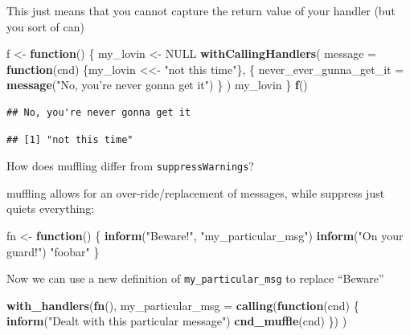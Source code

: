 \documentclass[]{book}
\newenvironment{Shaded}{\begin{snugshade}}{\end{snugshade}}
\newcommand{\ControlFlowTok}[1]{\textcolor[rgb]{0.13,0.29,0.53}{\textbf{#1}}}
\newcommand{\DataTypeTok}[1]{\textcolor[rgb]{0.13,0.29,0.53}{#1}}
\newcommand{\KeywordTok}[1]{\textcolor[rgb]{0.13,0.29,0.53}{\textbf{#1}}}
\newcommand{\NormalTok}[1]{#1}
\newcommand{\OtherTok}[1]{\textcolor[rgb]{0.56,0.35,0.01}{#1}}
\newcommand{\StringTok}[1]{\textcolor[rgb]{0.31,0.60,0.02}{#1}}
\begin{document}
This just means that you cannot capture the return value of your handler (but you sort of can)

\begin{Shaded}
\begin{Highlighting}[]
\NormalTok{f <-}\StringTok{ }\ControlFlowTok{function}\NormalTok{() \{}
\NormalTok{  my_lovin <-}\StringTok{ }\OtherTok{NULL}
  \KeywordTok{withCallingHandlers}\NormalTok{(}
    \DataTypeTok{message =} \ControlFlowTok{function}\NormalTok{(cnd) \{my_lovin <<-}\StringTok{ "not this time"}\NormalTok{\},}
\NormalTok{    \{}
\NormalTok{      never_ever_gunna_get_it =}\StringTok{ }\KeywordTok{message}\NormalTok{(}\StringTok{"No, you're never gonna get it"}\NormalTok{)}
\NormalTok{    \}}
\NormalTok{  )}
\NormalTok{  my_lovin}
\NormalTok{\}}
\KeywordTok{f}\NormalTok{()}
\end{Highlighting}
\end{Shaded}

\begin{verbatim}
## No, you're never gonna get it
\end{verbatim}

\begin{verbatim}
## [1] "not this time"
\end{verbatim}

How does muffling differ from \texttt{suppressWarnings}?

muffling allows for an over-ride/replacement of messages, while suppress just quiets everything:

\begin{Shaded}
\begin{Highlighting}[]
\NormalTok{fn <-}\StringTok{ }\ControlFlowTok{function}\NormalTok{() \{}
  \KeywordTok{inform}\NormalTok{(}\StringTok{"Beware!"}\NormalTok{, }\StringTok{"my_particular_msg"}\NormalTok{)}
  \KeywordTok{inform}\NormalTok{(}\StringTok{"On your guard!"}\NormalTok{)}
  \StringTok{"foobar"}
\NormalTok{\}}
\end{Highlighting}
\end{Shaded}

Now we can use a new definition of \texttt{my\_particular\_msg} to replace ``Beware''

\begin{Shaded}
\begin{Highlighting}[]
\KeywordTok{with_handlers}\NormalTok{(}\KeywordTok{fn}\NormalTok{(),}
  \DataTypeTok{my_particular_msg =} \KeywordTok{calling}\NormalTok{(}\ControlFlowTok{function}\NormalTok{(cnd) \{}
    \KeywordTok{inform}\NormalTok{(}\StringTok{"Dealt with this particular message"}\NormalTok{)}
    \KeywordTok{cnd_muffle}\NormalTok{(cnd)}
\NormalTok{  \})}
\NormalTok{)}
\end{Highlighting}
\end{Shaded}
\end{document}
